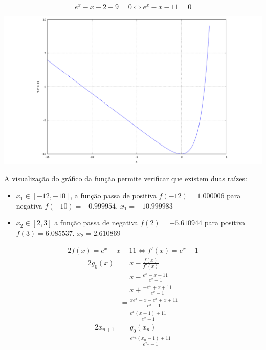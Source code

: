 \setcounter{chapter}{18}
{
\renewcommand{\thesubsection}{\thesection\alph{subsection}}
\begin{equation*}
	e^x-x-2-9=0 \iff e^x-x-11=0
\end{equation*}

\begin{center} \includegraphics[scale=0.32]{2019T1_1a} \end{center}
A visualização do gráfico da função permite verificar que existem duas raízes:
\begin{itemize}
	\item $x_1 \in [-12,-10]$, a função passa de positiva $f(-12)=1.000006$ para negativa $f(-10)=-0.999954$. $x_1 = -10.999983$
	\item $x_2 \in [2,3]$ a função passa de negativa $f(2)=- 5.610944$ para positiva $f(3)=6.085537$. $x_2=2.610869$
\end{itemize}

\begin{alignat*}{2}
f(x)=e^x-x-11 \iff f'(x)=e^x-1
\end{alignat*}
\begin{alignat*}{2}
g_0(x)
&=x-\frac{f(x)}{f'(x)} \\
&=x-\frac{e^x-x-11}{e^x-1}\\
&=x+\frac{-e^x+x+11}{e^x-1}\\
&=\frac{xe^x-x-e^x+x+11}{e^x-1}\\
&=\frac{e^x(x-1)+11}{e^x-1}
\end{alignat*}
\begin{alignat*}{2}
x_{n+1}
&=g_0(x_n) \\
&=\frac{e^{x_n}(x_n-1)+11}{e^{x_n}-1}
\end{alignat*}


}
